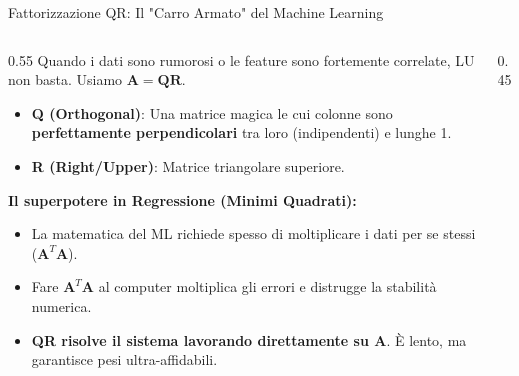 \documentclass[aspectratio=169, 10pt]{beamer}
\begin{document}
\begin{frame}{Fattorizzazione QR: Il "Carro Armato" del Machine Learning}
    \begin{columns}[T,onlytextwidth]
        \begin{column}{0.55\textwidth}
            \small
            \vspace{0.1cm}
            Quando i dati sono rumorosi o le feature sono fortemente correlate, LU non basta. Usiamo $\mathbf{A} = \mathbf{Q}\mathbf{R}$.
            
            \vspace{0.3cm}
            \begin{itemize}
                \setlength\itemsep{0.7em}
                \item \textbf{Q (Orthogonal)}: Una matrice magica le cui colonne sono \textbf{perfettamente perpendicolari} tra loro (indipendenti) e lunghe 1.
                \item \textbf{R (Right/Upper)}: Matrice triangolare superiore.
            \end{itemize}
            
            \vspace{0.3cm}
            \textbf{Il superpotere in Regressione (Minimi Quadrati):}
            \begin{itemize}
                \item La matematica del ML richiede spesso di moltiplicare i dati per se stessi ($\mathbf{A}^T\mathbf{A}$).
                \item Fare $\mathbf{A}^T\mathbf{A}$ al computer moltiplica gli errori e distrugge la stabilità numerica.
                \item \textbf{QR risolve il sistema lavorando direttamente su $\mathbf{A}$}. È lento, ma garantisce pesi ultra-affidabili.
            \end{itemize}
        \end{column}
        
        \begin{column}{0.45\textwidth}
            \centering
            \vspace{0.5cm}
\end{column}
\end{columns}
\end{frame}
\end{document}

